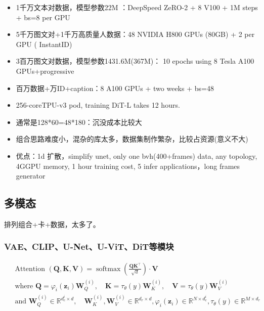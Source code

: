 

\begin{itemize}
    \item 1千万文本对数据，模型参数22M ：DeepSpeed ZeRO-2 +  8 V100 + 1M steps + bs=8 per GPU
    \item 5千万图文对+1千万高质量人数据：48 NVIDIA H800 GPUs (80GB) + 2 per GPU ( InstantID)
    \item 3百万图文对数据，模型参数1431.6M(367M)： 10 epochs using 8 Tesla A100 GPUs+progressive 
    \item 百万数据+万ID+caption：8 A100 GPUs + two weeks + bs=48
    \item 256-coreTPU-v3 pod, training DiT-L takes 12 hours.
    \item 通常是128*60=48*180：沉没成本比较大
    \item 组合思路难度小，混杂的库太多，数据集制作繁杂，比较占资源(意义不大)
    \item 优点：1d 扩散，simplify unet, only one bvh(400+frames) data, any topology,  4GGPU memory, 1 hour training cost, 5 infer applications，long frames generator
\end{itemize}

\subsection{多模态}

排列组合+卡+数据，太多了。

\subsubsection{VAE、CLIP、U-Net、U-ViT、DiT等模块}



\begin{equation}
  \begin{aligned} & 
    \text { Attention }(\mathbf{Q}, \mathbf{K}, \mathbf{V})=\operatorname{softmax}\left(\frac{\mathbf{Q K}^{\top}}{\sqrt{d}}\right) \cdot \mathbf{V} \\ 
    & \text { where } \mathbf Q=\varphi_i(\mathbf z_i)\mathbf W_Q^{(i)},\quad\mathbf K=\tau_\theta(y)\mathbf W_K^{(i)},\quad\mathbf V=\tau_\theta(y)\mathbf W_V^{(i)} \\ 
    & \text { and } \mathbf W_Q^{(i)}\in\mathbb R^{d_c^i\times d},\quad\mathbf W_K^{(i)},\mathbf W_V^{(i)}\in\mathbb R^{d_r\times d}, \varphi_i\left(\mathbf{z}_i\right) \in \mathbb{R}^{N \times d_c^i}, \tau_\theta(y) \in \mathbb{R}^{M \times d_r}
  \end{aligned}
\end{equation}


